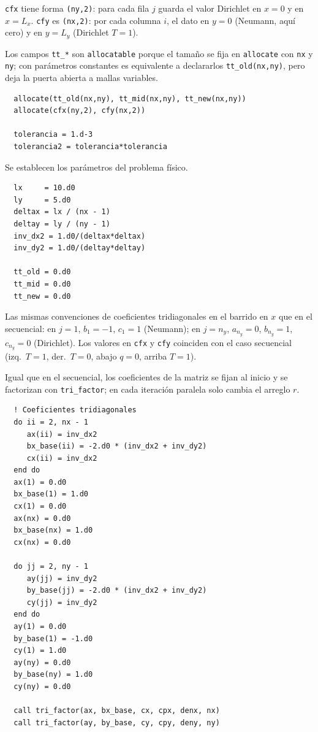 \documentclass[11pt,a4paper]{article}
\begin{document}
\texttt{cfx} tiene forma \texttt{(ny,2)}: para cada fila $j$ guarda el valor Dirichlet
en $x=0$ y en $x=L_x$. \texttt{cfy} es \texttt{(nx,2)}: por cada columna $i$, el dato
en $y=0$ (Neumann, aqu\'i cero) y en $y=L_y$ (Dirichlet $T=1$). 

\medskip

Los campos \texttt{tt\_*} son \texttt{allocatable} porque el
tamaño se fija en \texttt{allocate} con \texttt{nx} y \texttt{ny}; con par\'ametros
constantes es equivalente a declararlos \texttt{tt\_old(nx,ny)}, pero deja la puerta
abierta a mallas variables. 

\begin{verbatim}
  allocate(tt_old(nx,ny), tt_mid(nx,ny), tt_new(nx,ny))
  allocate(cfx(ny,2), cfy(nx,2))

  tolerancia = 1.d-3
  tolerancia2 = tolerancia*tolerancia
\end{verbatim}

Se establecen los par\'ametros del problema f\'isico.

\begin{verbatim}
  lx     = 10.d0
  ly     = 5.d0
  deltax = lx / (nx - 1)
  deltay = ly / (ny - 1)
  inv_dx2 = 1.d0/(deltax*deltax)
  inv_dy2 = 1.d0/(deltay*deltay)

  tt_old = 0.d0
  tt_mid = 0.d0
  tt_new = 0.d0
\end{verbatim}

Las mismas convenciones de coeficientes tridiagonales en el barrido en $x$ que en
el secuencial: en $j=1$, $b_1=-1$, $c_1=1$ (Neumann); en $j=n_y$, $a_{n_y}=0$,
$b_{n_y}=1$, $c_{n_y}=0$ (Dirichlet). Los valores en \texttt{cfx} y \texttt{cfy}
coinciden con el caso secuencial (izq.\ $T=1$, der.\ $T=0$, abajo
$q=0$, arriba $T=1$).

\medskip

Igual que en el secuencial, los coeficientes de la matriz se fijan al inicio y
se factorizan con \texttt{tri\_factor}; en cada iteraci\'on paralela solo cambia
el arreglo $r$. 

\begin{verbatim}
  ! Coeficientes tridiagonales
  do ii = 2, nx - 1
     ax(ii) = inv_dx2
     bx_base(ii) = -2.d0 * (inv_dx2 + inv_dy2)
     cx(ii) = inv_dx2
  end do
  ax(1) = 0.d0
  bx_base(1) = 1.d0
  cx(1) = 0.d0
  ax(nx) = 0.d0
  bx_base(nx) = 1.d0
  cx(nx) = 0.d0

  do jj = 2, ny - 1
     ay(jj) = inv_dy2
     by_base(jj) = -2.d0 * (inv_dx2 + inv_dy2)
     cy(jj) = inv_dy2
  end do
  ay(1) = 0.d0
  by_base(1) = -1.d0
  cy(1) = 1.d0
  ay(ny) = 0.d0
  by_base(ny) = 1.d0
  cy(ny) = 0.d0

  call tri_factor(ax, bx_base, cx, cpx, denx, nx)
  call tri_factor(ay, by_base, cy, cpy, deny, ny)
\end{verbatim}
\end{document}
